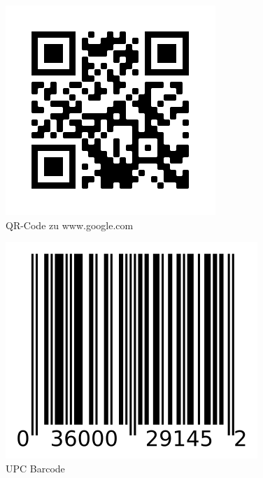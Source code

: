 \begin{figure}[H]
  \centering
  \includegraphics[scale=1]{pics/googleQR.png}
  \caption{QR-Code zu www.google.com}
  \label{fig:tech:qrCode}
\end{figure}

\begin{figure}[H]
  \centering
  \includegraphics[scale=0.8]{pics/UPCBarcode.png}
  \caption{UPC Barcode}
  \label{fig:tech:barcode}
\end{figure}

